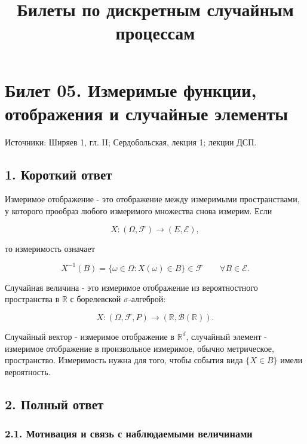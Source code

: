 \documentclass[
  11pt,
  a4paper,
]{article}
\title{Билеты по дискретным случайным процессам}
\author{}
\date{}
\begin{document}
\maketitle

\section{Билет 05. Измеримые функции, отображения и случайные
элементы}\label{ux431ux438ux43bux435ux442-05.-ux438ux437ux43cux435ux440ux438ux43cux44bux435-ux444ux443ux43dux43aux446ux438ux438-ux43eux442ux43eux431ux440ux430ux436ux435ux43dux438ux44f-ux438-ux441ux43bux443ux447ux430ux439ux43dux44bux435-ux44dux43bux435ux43cux435ux43dux442ux44b}

Источники: Ширяев 1, гл. II; Сердобольская, лекция 1; лекции ДСП.

\subsection{1. Короткий
ответ}\label{ux43aux43eux440ux43eux442ux43aux438ux439-ux43eux442ux432ux435ux442}

Измеримое отображение - это отображение между измеримыми пространствами,
у которого прообраз любого измеримого множества снова измерим. Если

\[
X:(\Omega,\mathcal F)\to(E,\mathcal E),
\]

то измеримость означает

\[
X^{-1}(B)=\{\omega\in\Omega:X(\omega)\in B\}\in\mathcal F
\qquad \forall B\in\mathcal E.
\]

Случайная величина - это измеримое отображение из вероятностного
пространства в \(\mathbb R\) с борелевской \(\sigma\)-алгеброй:

\[
X:(\Omega,\mathcal F,P)\to(\mathbb R,\mathcal B(\mathbb R)).
\]

Случайный вектор - измеримое отображение в \(\mathbb R^d\), случайный
элемент - измеримое отображение в произвольное измеримое, обычно
метрическое, пространство. Измеримость нужна для того, чтобы события
вида \(\{X\in B\}\) имели вероятность.

\subsection{2. Полный
ответ}\label{ux43fux43eux43bux43dux44bux439-ux43eux442ux432ux435ux442}

\subsubsection{2.1. Мотивация и связь с наблюдаемыми
величинами}\label{ux43cux43eux442ux438ux432ux430ux446ux438ux44f-ux438-ux441ux432ux44fux437ux44c-ux441-ux43dux430ux431ux43bux44eux434ux430ux435ux43cux44bux43cux438-ux432ux435ux43bux438ux447ux438ux43dux430ux43cux438}
\end{document}
